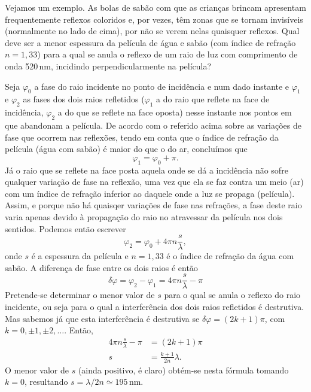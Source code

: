 Vejamos um exemplo. As bolas de sabão com que as crianças brincam apresentam
frequentemente reflexos coloridos e, por vezes, têm zonas que se tornam
invisíveis (normalmente no lado de cima), por não se verem nelas quaisquer
reflexos. Qual deve ser a menor espessura da película de água e sabão (com
índice de refração $n=1,33$) para a qual se anula o reflexo de um raio de luz
com comprimento de onda 520\,nm, incidindo perpendicularmente na película?

Seja $\varphi_0$ a fase do raio incidente no ponto de incidência e num dado
instante e $\varphi_1$ e $\varphi_2$ as fases dos dois raios refletidos
($\varphi_1$ a do raio que reflete na face de incidência, $\varphi_2$ a do que
se reflete na face oposta) nesse instante nos pontos em que abandonam a
película. De acordo com o referido acima sobre as variações de fase que ocorrem
nas reflexões, tendo em conta que o índice de refração da película (água com
sabão) é maior do que o do ar, concluímos que 
\begin{equation*}
\varphi_1=\varphi_0+\pi.
\end{equation*}
Já o raio que se reflete na face posta aquela onde se dá a incidência não sofre
qualquer variação de fase na reflexão, uma vez que ela se faz contra um meio
(ar) com um índice de refração inferior ao daquele onde a luz se propaga
(película). Assim, e porque não há quaisqer variações de fase nas refrações, a
fase deste raio varia apenas devido à propagação do raio no atravessar da
película nos dois sentidos. Podemos então escrever
\begin{equation*}
\varphi_2= \varphi_0+4\pi n\frac{s}{\lambda},
\end{equation*}
onde $s$ é a espessura da película e $n=1,33$ é o índice de refração da água com
sabão. A diferença de fase entre os dois raios é então
\begin{equation*}
\delta\varphi = \varphi_2-\varphi_1=4\pi n\frac{s}{\lambda}-\pi
\end{equation*}
Pretende-se determinar o menor valor de $s$ para o qual se anula o reflexo do
raio incidente, ou seja para o qual a interferência dos dois raios refletidos é
destrutiva. Mas sabemos já que esta interferência é destrutiva se
$\delta\varphi=(2k+1)\pi$, com $k=0,\pm1,\pm2,\ldots$. Então,
\begin{align*}
4\pi n\frac{s}{\lambda}-\pi&=(2k+1)\pi\\
s&=\frac{k+1}{2n}\lambda.
\end{align*}
O menor valor de $s$ (ainda positivo, é claro) obtém-se nesta fórmula tomando
$k=0$, resultando $s=\lambda/2n\simeq 195$\,nm.


